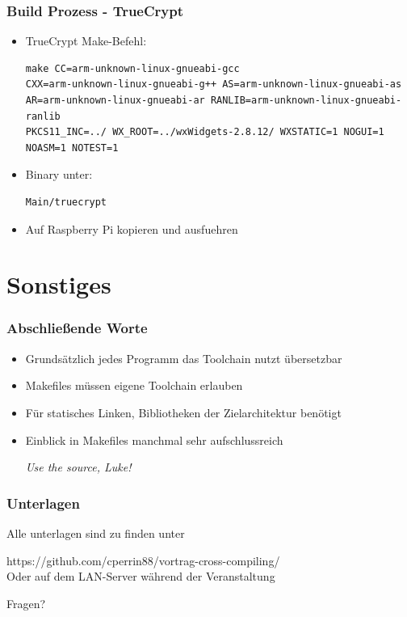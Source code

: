 \documentclass{beamer}
\begin{document}
\begin{frame}[fragile]
\frametitle{Build Prozess - TrueCrypt}
\begin{itemize}
\item TrueCrypt Make-Befehl: 
\begin{tiny}
\begin{verbatim}
make CC=arm-unknown-linux-gnueabi-gcc
CXX=arm-unknown-linux-gnueabi-g++ AS=arm-unknown-linux-gnueabi-as
AR=arm-unknown-linux-gnueabi-ar RANLIB=arm-unknown-linux-gnueabi-ranlib
PKCS11_INC=../ WX_ROOT=../wxWidgets-2.8.12/ WXSTATIC=1 NOGUI=1 NOASM=1 NOTEST=1
\end{verbatim}
\end{tiny}
\item Binary unter:
\begin{verbatim}
Main/truecrypt
\end{verbatim}
\item Auf Raspberry Pi kopieren und ausfuehren
\end{itemize}
\end{frame}

\section{Sonstiges}

\begin{frame}
\frametitle{Abschließende Worte}
\begin{itemize}
\item Grundsätzlich jedes Programm das Toolchain nutzt übersetzbar
\item Makefiles müssen eigene Toolchain erlauben
\item Für statisches Linken, Bibliotheken der Zielarchitektur benötigt
\item Einblick in Makefiles manchmal sehr aufschlussreich\\
\begin{large}
\begin{center}
\textit{Use the source, Luke!}
\end{center}
\end{large}
\end{itemize}
\end{frame}

\begin{frame}
\begin{Huge}
\begin{center}
\frametitle{Unterlagen}
\begin{LARGE}
Alle unterlagen sind zu finden unter
\end{LARGE}
{\large https://github.com/cperrin88/vortrag-cross-compiling/}\\
{\normalsize Oder auf dem LAN-Server während der Veranstaltung}
\end{center}
\end{Huge}
\end{frame}

\begin{frame}
\begin{Huge}
\begin{center}
Fragen?
\end{center}
\end{Huge}
\end{frame}
\end{document}
